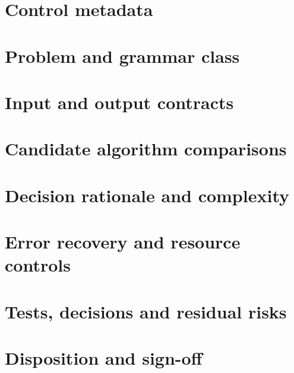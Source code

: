 \documentclass[11pt,letterpaper]{article}
\begin{document}
\makedoctitle\makedocsummary
\section{Control metadata}
\section{Problem and grammar class}
\section{Input and output contracts}
\section{Candidate algorithm comparisons}
\section{Decision rationale and complexity}
\section{Error recovery and resource controls}
\section{Tests, decisions and residual risks}
\section{Disposition and sign-off}
\end{document}
